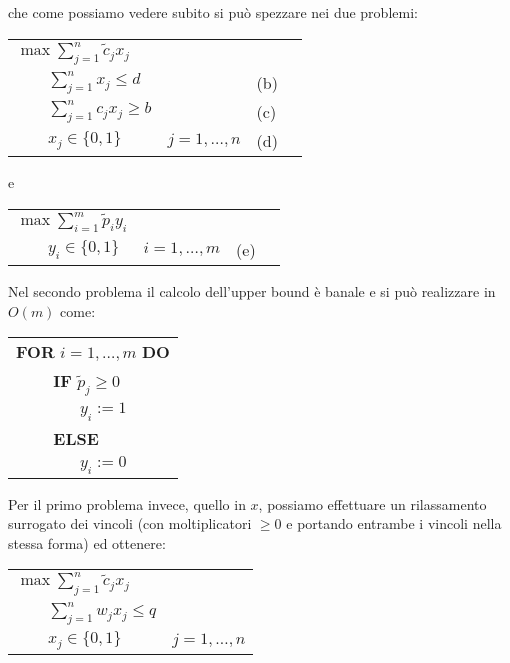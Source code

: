 \documentclass[11pt]{book}
\begin{document}
che come possiamo vedere subito si pu\`o spezzare nei due problemi:

\begin{center}
\begin{tabular}{llp{1cm}l}
$\max \sum\limits_{j=1}^n \tilde{c}_jx_j$\\
$\qquad \sum\limits_{j=1}^n x_j \leq d$ & & (b) \\
$\qquad \sum\limits_{j=1}^n c_jx_j \geq b$ & & (c) \\
$\qquad x_j \in \{0,1\}$ & $j=1,\dots,n$ & (d) \\
\end{tabular}
\end{center}

e

\begin{center}
\begin{tabular}{llp{1cm}l}
$\max \sum\limits_{i=1}^m \tilde{p}_iy_i$\\
$\qquad y_i \in \{0,1\}$ & $i=1,\dots,m$ & (e) \\
\end{tabular}
\end{center}

Nel secondo problema il calcolo dell'upper bound \`e banale e si pu\`o
realizzare in $O(m)$ come:

\vspace{20pt}
\begin{tabular}{l}
\textbf{FOR} $i=1,\dots,m$ \textbf{DO}\\
$\qquad$ \textbf{IF} $\tilde{p}_j \geq 0$\\
$\qquad\qquad y_i := 1$\\
$\qquad$ \textbf{ELSE}\\
$\qquad\qquad y_i := 0$\\
\end{tabular}
\vspace{20pt}

Per il primo problema invece, quello in $x$, possiamo effettuare un
rilassamento surrogato dei vincoli (con moltiplicatori $\geq 0$ e
portando entrambe i vincoli nella stessa forma) ed ottenere:

\begin{center}
\begin{tabular}{ll}
$\max \sum\limits_{j=1}^n \tilde{c}_j x_j$ \\
$\qquad \sum\limits_{j=1}^n w_j x_j \leq q$ \\
$\qquad x_j \in \{0, 1\}$ & $j=1,\dots,n$ \\
\end{tabular}
\end{center}
\end{document}
